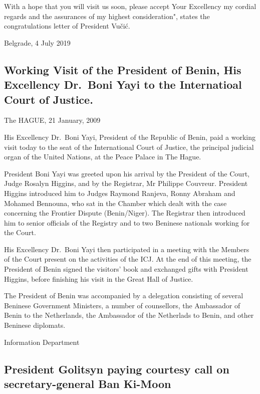 \documentclass[
  openany]{book}
\begin{document}
With a hope that you will visit us soon, please accept Your Excellency my cordial regards and the assurances of my highest consideration", states the congratulations letter of President Vučić.

Belgrade,
4 July 2019

\hypertarget{working-visit-of-the-president-of-benin-his-excellency-dr.-boni-yayi-to-the-internatioal-court-of-justice.}{%
\subsection{Working Visit of the President of Benin, His Excellency Dr.~Boni Yayi to the Internatioal Court of Justice.}\label{working-visit-of-the-president-of-benin-his-excellency-dr.-boni-yayi-to-the-internatioal-court-of-justice.}}

The HAGUE,
21 January, 2009

His Excellency Dr.~Boni Yayi, President of the Republic of Benin, paid a working visit today to the seat of the International Court of Justice, the principal judicial organ of the United Nations, at the Peace Palace in The Hague.

President Boni Yayi was greeted upon his arrival by the President of the Court, Judge Rosalyn Higgins, and by the Registrar, Mr Philippe Couvreur. President Higgins introduced him to Judges Raymond Ranjeva, Ronny Abraham and Mohamed Bennouna, who sat in the Chamber which dealt with the case concerning the Frontier Dispute (Benin/Niger). The Registrar then introduced him to senior officials of the Registry and to two Beninese nationals working for the Court.

His Excellency Dr.~Boni Yayi then participated in a meeting with the Members of the Court present on the activities of the ICJ. At the end of this meeting, the President of Benin signed the visitors' book and exchanged gifts with President Higgins, before finishing his visit in the Great Hall of Justice.

The President of Benin was accompanied by a delegation consisting of several Beninese Government Ministers, a number of counsellors, the Ambassador of Benin to the Netherlands, the Ambassador of the Netherlads to Benin, and other Beninese diplomats.

Information Department

\hypertarget{president-golitsyn-paying-courtesy-call-on-secretary-general-ban-ki-moon}{%
\subsection{President Golitsyn paying courtesy call on secretary-general Ban Ki-Moon}\label{president-golitsyn-paying-courtesy-call-on-secretary-general-ban-ki-moon}}
\end{document}
